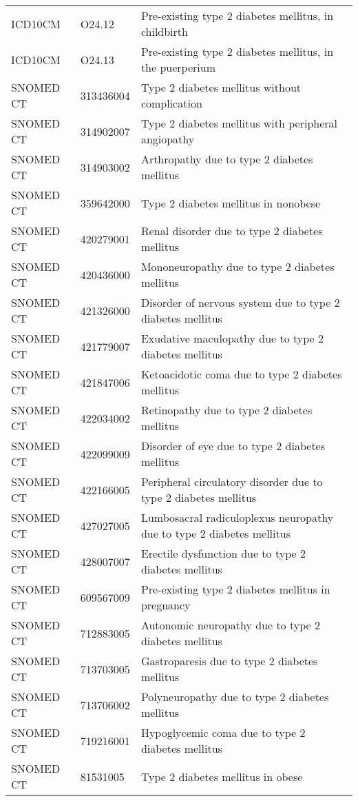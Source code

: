 \begin{longtable}{p{}p{}p{}}
  ICD10CM & O24.12 & Pre-existing type 2 diabetes mellitus, in childbirth \\ 
  ICD10CM & O24.13 & Pre-existing type 2 diabetes mellitus, in the puerperium \\ 
  SNOMED CT & 313436004 & Type 2 diabetes mellitus without complication \\ 
  SNOMED CT & 314902007 & Type 2 diabetes mellitus with peripheral angiopathy \\ 
  SNOMED CT & 314903002 & Arthropathy due to type 2 diabetes mellitus \\ 
  SNOMED CT & 359642000 & Type 2 diabetes mellitus in nonobese \\ 
  SNOMED CT & 420279001 & Renal disorder due to type 2 diabetes mellitus \\ 
  SNOMED CT & 420436000 & Mononeuropathy due to type 2 diabetes mellitus \\ 
  SNOMED CT & 421326000 & Disorder of nervous system due to type 2 diabetes mellitus \\ 
  SNOMED CT & 421779007 & Exudative maculopathy due to type 2 diabetes mellitus \\ 
  SNOMED CT & 421847006 & Ketoacidotic coma due to type 2 diabetes mellitus \\ 
  SNOMED CT & 422034002 & Retinopathy due to type 2 diabetes mellitus \\ 
  SNOMED CT & 422099009 & Disorder of eye due to type 2 diabetes mellitus \\ 
  SNOMED CT & 422166005 & Peripheral circulatory disorder due to type 2 diabetes mellitus \\ 
  SNOMED CT & 427027005 & Lumbosacral radiculoplexus neuropathy due to type 2 diabetes mellitus \\ 
  SNOMED CT & 428007007 & Erectile dysfunction due to type 2 diabetes mellitus \\ 
  SNOMED CT & 609567009 & Pre-existing type 2 diabetes mellitus in pregnancy \\ 
  SNOMED CT & 712883005 & Autonomic neuropathy due to type 2 diabetes mellitus \\ 
  SNOMED CT & 713703005 & Gastroparesis due to type 2 diabetes mellitus \\ 
  SNOMED CT & 713706002 & Polyneuropathy due to type 2 diabetes mellitus \\ 
  SNOMED CT & 719216001 & Hypoglycemic coma due to type 2 diabetes mellitus \\ 
  SNOMED CT & 81531005 & Type 2 diabetes mellitus in obese \\ 

\end{longtable}

